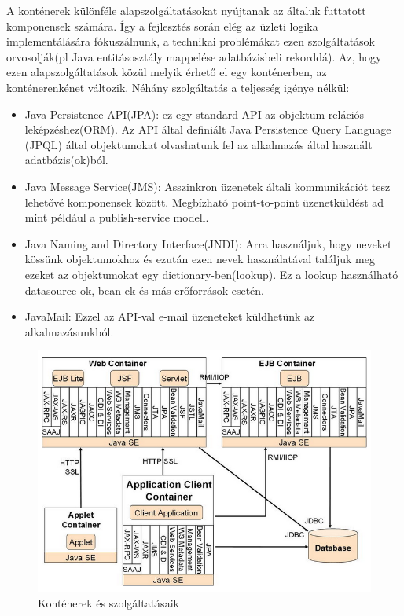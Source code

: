 \documentclass[centeredchapter]{thesis-ekf}
\theoremstyle{definition}
\theoremstyle{remark}
\begin{document}
A \hyperlink{figure-container-services}{konténerek különféle alapszolgáltatásokat} nyújtanak az általuk futtatott komponensek számára.
Így a fejlesztés során elég az üzleti logika implementálására fókuszálnunk, a technikai problémákat ezen szolgáltatások orvosolják(pl Java entitásosztály mappelése adatbázisbeli rekorddá).
Az, hogy ezen alapszolgáltatások közül melyik érhető el egy konténerben, az konténerenkénet változik.
Néhány szolgáltatás a teljesség igénye nélkül:
\begin{itemize}
	\item Java Persistence API(JPA): ez egy standard API az objektum relációs leképzéshez(ORM). Az API által definiált Java Persistence Query Language (JPQL) által objektumokat olvashatunk fel az alkalmazás által használt adatbázis(ok)ból.
	\item Java Message Service(JMS): Asszinkron üzenetek általi kommunikációt tesz lehetővé komponensek között. Megbízható point-to-point üzenetküldést ad mint például a publish-service modell.
	\item Java Naming and Directory Interface(JNDI): Arra használjuk, hogy neveket kössünk objektumokhoz és ezután ezen nevek használatával találjuk meg ezeket az objektumokat egy dictionary-ben(lookup). Ez a lookup használható datasource-ok, bean-ek és más erőforrások esetén.
	\item JavaMail: Ezzel az API-val e-mail üzeneteket küldhetünk az alkalmazásunkból.
	
\end{itemize}

\hypertarget{figure-container-services}{}
\begin{figure}[!h]
	\centering
	\includegraphics[width=14cm]{kontener-szolgaltatasok.png}
	\caption{Konténerek és szolgáltatásaik}
\end{figure}
\end{document}
